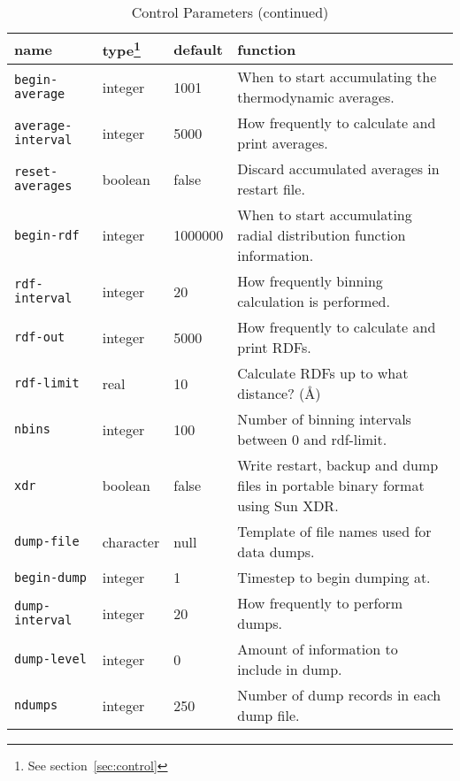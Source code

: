 \documentclass[twoside]{report}
\begin{document}
\begin{table}
\begin{minipage}{\textwidth}
\caption{Control Parameters (continued)}
\setlength{\rightskip}{0pt plus 2cm}
\begin{tabular}{|l|l|l|p{2.9in}|}
\hline
{\bf name} & {\bf type}\footnote{See section~\ref{sec:control}} &
{\bf default} & {\bf function} \\ \hline \hline
\texttt{begin-average} &          integer &               1001 &
When to start accumulating the thermodynamic averages. \\
\texttt{average-interval} &       integer &               5000 &
How frequently to calculate and print averages. \\
\texttt{reset-averages} &         boolean &               false  &
Discard accumulated averages in restart file. \\ \hline
\texttt{begin-rdf} &              integer &               1000000 &
When to start accumulating radial distribution function information. \\
\texttt{rdf-interval} &           integer &               20 &
How frequently binning calculation is performed. \\
\texttt{rdf-out} &                integer &               5000 &
How frequently to calculate and print RDFs. \\
\texttt{rdf-limit} &              real &                  10 &
Calculate RDFs up to what distance? (\AA) \\
\texttt{nbins} &                  integer &               100 &
Number of binning intervals between 0 and rdf-limit. \\ \hline
\texttt{xdr} &                    boolean &               false &
Write restart,  backup and dump files in portable
binary format using Sun XDR. \\ \hline
\texttt{dump-file} &              character  &    null &
Template of file names used for data dumps. \\
\texttt{begin-dump} &             integer &               1 &
Timestep to begin dumping at. \\
\texttt{dump-interval} &          integer &               20 &
How frequently to perform dumps. \\
\texttt{dump-level} &             integer &               0 &
Amount of information to include in dump. \\
\texttt{ndumps} &         integer &               250 &
Number of dump records in each dump file. \\ \hline

\end{tabular}
\end{minipage}
\end{table}
\end{document}
